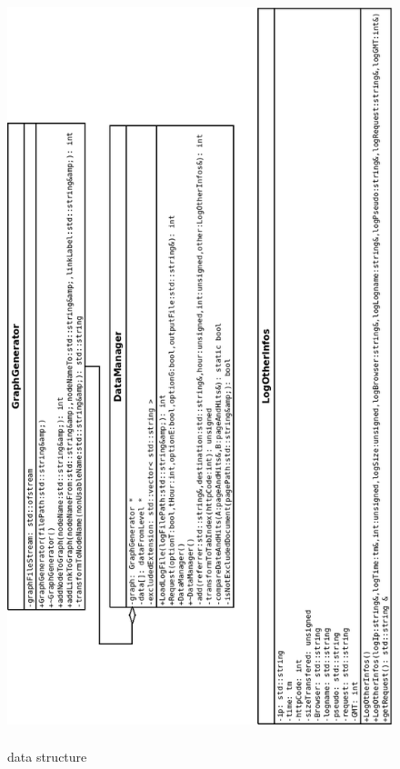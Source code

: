 \documentclass[a4paper, 12pts]{article}
\begin{document}
\begin{figure}[t]
	\caption{data structure}
	\includegraphics[height=22cm]{../diagrammes/classes/classeDiagram.png}
\end{figure}
\end{document}
